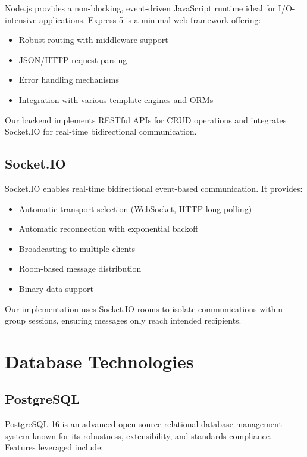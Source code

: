 \documentclass[12pt]{report}
\begin{document}
Node.js provides a non-blocking, event-driven JavaScript runtime ideal for I/O-intensive applications. Express 5 is a minimal web framework offering:

\begin{itemize}
    \item Robust routing with middleware support
    \item JSON/HTTP request parsing
    \item Error handling mechanisms
    \item Integration with various template engines and ORMs
\end{itemize}

Our backend implements RESTful APIs for CRUD operations and integrates Socket.IO for real-time bidirectional communication.

\subsection{Socket.IO}

Socket.IO enables real-time bidirectional event-based communication. It provides:

\begin{itemize}
    \item Automatic transport selection (WebSocket, HTTP long-polling)
    \item Automatic reconnection with exponential backoff
    \item Broadcasting to multiple clients
    \item Room-based message distribution
    \item Binary data support
\end{itemize}

Our implementation uses Socket.IO rooms to isolate communications within group sessions, ensuring messages only reach intended recipients.

\section{Database Technologies}

\subsection{PostgreSQL}

PostgreSQL 16 is an advanced open-source relational database management system known for its robustness, extensibility, and standards compliance. Features leveraged include:
\end{document}
